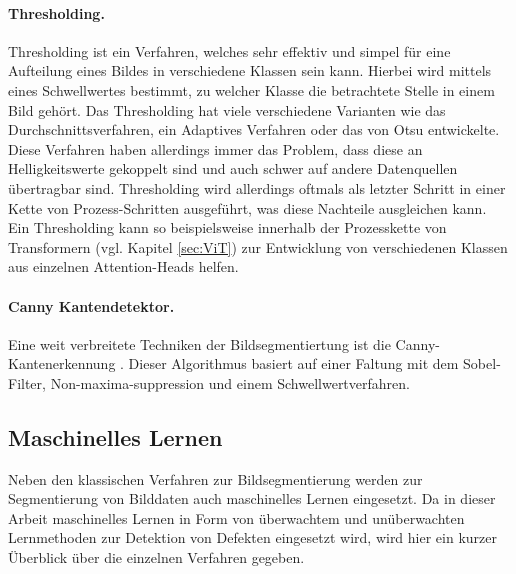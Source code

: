 \paragraph{Thresholding.}
 Thresholding ist ein Verfahren, welches sehr effektiv und simpel für eine Aufteilung eines Bildes in verschiedene Klassen sein kann. Hierbei wird mittels eines Schwellwertes bestimmt, zu welcher Klasse die betrachtete Stelle in einem Bild gehört. Das Thresholding hat viele verschiedene Varianten wie das Durchschnittsverfahren, ein Adaptives Verfahren oder das von Otsu\cite{otsu4310076} entwickelte. Diese Verfahren haben allerdings immer das Problem, dass diese an Helligkeitswerte gekoppelt sind und auch schwer auf andere Datenquellen übertragbar sind. Thresholding wird allerdings oftmals als letzter Schritt in einer Kette von Prozess-Schritten ausgeführt, was diese Nachteile ausgleichen kann. \\
 Ein Thresholding kann so beispielsweise innerhalb der Prozesskette von Transformern (vgl. Kapitel \ref{sec:ViT}) zur Entwicklung von verschiedenen Klassen aus einzelnen Attention-Heads helfen. 
 
\paragraph{Canny Kantendetektor.}
Eine weit verbreitete Techniken der Bildsegmentiertung ist die Canny-Kantenerkennung \cite{Canny1986}. Dieser Algorithmus basiert auf einer Faltung mit dem Sobel-Filter, Non-maxima-suppression und einem Schwellwertverfahren.


\subsection{Maschinelles Lernen}

Neben den klassischen Verfahren zur Bildsegmentierung werden zur Segmentierung von Bilddaten auch maschinelles Lernen eingesetzt. Da in dieser Arbeit maschinelles Lernen in Form von überwachtem und unüberwachten Lernmethoden zur Detektion von Defekten eingesetzt wird, wird hier ein kurzer Überblick über die einzelnen Verfahren gegeben. 


